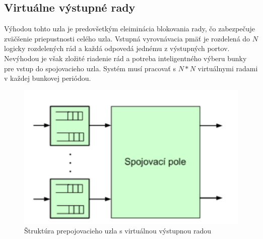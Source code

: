 \subsection{Virtuálne výstupné rady}
Výhodou tohto uzla je predovšetkým eleiminácia blokovania rady, čo zabezpečuje zväčšenie priepustnosti celého uzla. Vstupná vyrovnávacia pmäť je rozdelená do $N$ logicky rozdelených rád a každá odpovedá jednému z výstupných portov. Nevýhodou je však zložité riadenie rád a potreba inteligentného výberu bunky pre vstup do spojovacieho uzla. Systém musí pracovať s $N*N$ virtuálnymi radami v každej bunkovej periódou.

\begin{figure}[ht]
\centering
  \begin{center}
    \includegraphics[scale=0.8]{images/propoj_virt.png}
  \end{center}
  \caption[Štruktúra prepojovacieho uzla s virtuálnou výstupnou radou]{Štruktúra prepojovacieho uzla s virtuálnou výstupnou radou}
\end{figure}